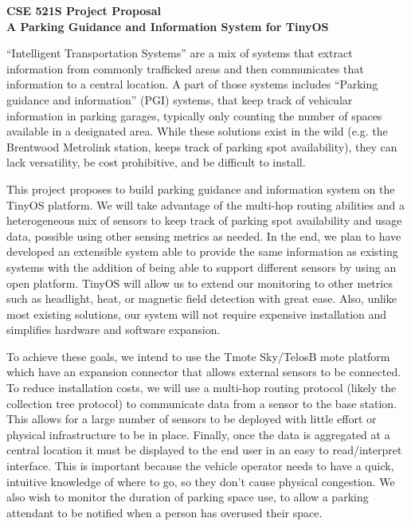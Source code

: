 \documentclass[11pt]{article}
\begin{document}
\begin{center}
{\bf \large CSE 521S Project Proposal\\
A Parking Guidance and Information System for TinyOS}
\end{center}

``Intelligent Transportation Systems'' are a mix of systems that extract
information from commonly trafficked areas and then communicates that
information to a central location.
A part of those systems includes ``Parking guidance and information'' (PGI)
systems, that keep track of vehicular information in parking garages, typically
only counting the number of spaces available in a designated area.
While these solutions exist in the wild (e.g. the Brentwood Metrolink station,
keeps track of parking spot availability), they can lack versatility, 
be cost prohibitive, and be difficult to install.

This project proposes to build parking guidance and information system on the
TinyOS platform.
We will take advantage of the multi-hop routing abilities and a heterogeneous
mix of sensors to keep track of parking spot availability and usage data,
possible using other sensing metrics as needed.
In the end, we plan to have developed an extensible system able to provide the
same information as existing systems with the addition of being able to
support different sensors by using an open platform.
TinyOS will allow us to extend our monitoring to other metrics such as
headlight, heat, or magnetic field detection with great ease.
Also, unlike most existing solutions, our system will not require expensive
installation and simplifies hardware and software expansion.

To achieve these goals, we intend to use the Tmote Sky/TelosB mote platform
which have an expansion connector that allows external sensors to be connected.
To reduce installation costs, we will use a multi-hop routing protocol (likely
the collection tree protocol) to communicate data from a sensor to the base
station.
This allows for a large number of sensors to be deployed with little effort or
physical infrastructure to be in place.
Finally, once the data is aggregated at a central location it must be displayed
to the end user in an easy to read/interpret interface.
This is important because the vehicle operator needs to have a quick, intuitive
knowledge of where to go, so they don't cause physical congestion.
We also wish to monitor the duration of parking space use, to allow a parking
attendant to be notified when a person has overused their space.
\end{document}
